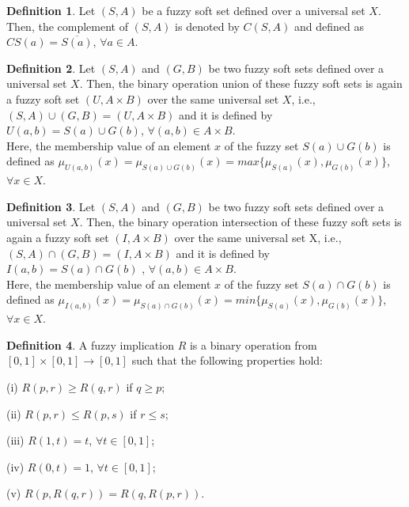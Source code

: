 \documentclass{article}
\theoremstyle{definition}
\newtheorem{definition}{Definition}[section]
\begin{document}
\begin{definition}\cite{10}
    Let $(S, A)$ be a fuzzy soft set defined over a universal set $X$. Then, the complement of $(S, A)$ is denoted by $C(S, A)$ and defined as $CS(a)= \overline {S(a)}$, $\forall a\in A$.\\
\end{definition}

\begin{definition}\cite{10}
    Let $(S, A)$ and $(G,B)$ be two fuzzy soft sets defined over a universal set $X$. Then, the binary operation union of these fuzzy soft sets is again a fuzzy soft set $(U, A \times B)$ over the same universal set $X$, i.e., $(S,A) \cup (G,B)=(U, A\times B)$ and it is defined by     $U(a, b)=S(a)\cup G(b)$, $\forall (a ,b) \in A\times B$.\\

Here, the membership value of  an element $x$ of the fuzzy set $S(a)\cup G(b)$ is defined as $\mu_{U(a,b)}(x) = \mu_{S(a)\cup G(b)}(x) = max\{\mu_{S(a)}(x), \mu_{G(b)}(x)\}$, $\forall x\in X$.\\
\end{definition}

\begin{definition}\cite{10}
     Let $(S, A)$ and $(G,B)$ be two fuzzy soft sets defined over a universal set $X$. Then, the binary operation intersection of these fuzzy soft sets is again a fuzzy soft set $(I, A \times B)$ over the same universal set X, i.e., $(S,A) \cap (G,B)=(I, A\times B)$ and it is defined by $I(a, b)=S(a)\cap G(b)$ , $\forall (a ,b) \in A\times B$.\\

Here, the membership value of an element $x$ of the fuzzy set $S(a)\cap G(b)$ is defined as $\mu_{I(a,b)}(x) = \mu_{S(a)\cap G(b)}(x) = min\{\mu_{S(a)}(x), \mu_{G(b)}(x)\}$, $\forall x\in X$.\\
\end{definition}

\begin{definition}\cite{13}
    A fuzzy implication $R$ is a binary operation from $[0, 1]\times [0, 1] \to [0, 1]$ such that the following properties hold:

    (i) $R(p, r)\geq R(q, r)$ if $q\geq p$;
    
    (ii) $R(p, r)\leq R(p, s)$ if $r\leq s$;

    (iii) $R(1, t)=t$, $\forall t\in [0, 1]$;

    (iv) $R(0, t)=1$, $\forall t\in [0, 1]$;

    (v) $R(p, R(q, r))=R(q, R(p, r))$.\\
\end{definition}
\end{document}
